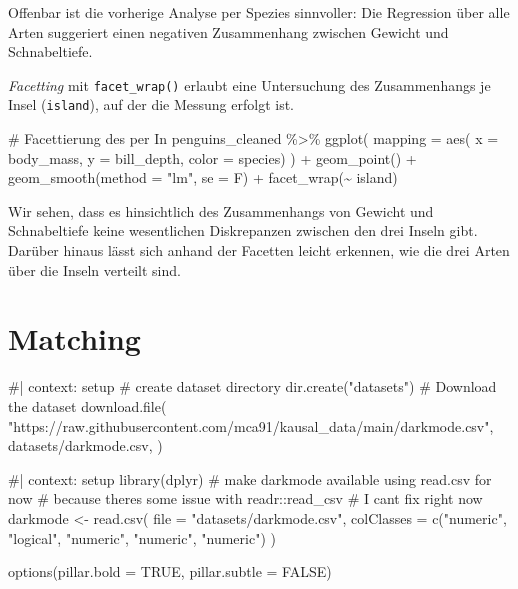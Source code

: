 \documentclass[
  a4paper,
  DIV=11,
  oneside]{scrreprt}
\newenvironment{Shaded}{\begin{snugshade}}{\end{snugshade}}
\newcommand{\NormalTok}[1]{\textcolor[rgb]{0.00,0.23,0.31}{#1}}
\begin{document}
Offenbar ist die vorherige Analyse per Spezies sinnvoller: Die
Regression über alle Arten suggeriert einen negativen Zusammenhang
zwischen Gewicht und Schnabeltiefe.

\emph{Facetting} mit \texttt{facet\_wrap()} erlaubt eine Untersuchung
des Zusammenhangs je Insel (\texttt{island}), auf der die Messung
erfolgt ist.

\begin{Shaded}
\begin{Highlighting}[]
\NormalTok{\# Facettierung des per In}
\NormalTok{penguins\_cleaned \%\textgreater{}\%}
\NormalTok{  ggplot(}
\NormalTok{    mapping = aes(}
\NormalTok{      x = body\_mass, }
\NormalTok{      y = bill\_depth, }
\NormalTok{      color = species)}
\NormalTok{  ) +}
\NormalTok{  geom\_point() +}
\NormalTok{  geom\_smooth(method = "lm", se = F) +}
\NormalTok{  facet\_wrap(\textasciitilde{} island)}
\end{Highlighting}
\end{Shaded}

Wir sehen, dass es hinsichtlich des Zusammenhangs von Gewicht und
Schnabeltiefe keine wesentlichen Diskrepanzen zwischen den drei Inseln
gibt. Darüber hinaus lässt sich anhand der Facetten leicht erkennen, wie
die drei Arten über die Inseln verteilt sind.


\chapter{Matching}\label{matching}

\begin{Shaded}
\begin{Highlighting}[]
\NormalTok{\#| context: setup}
\NormalTok{\# create dataset directory}
\NormalTok{dir.create("datasets")}
\NormalTok{\# Download the dataset}
\NormalTok{download.file(}
\NormalTok{    "https://raw.githubusercontent.com/mca91/kausal\_data/main/darkmode.csv",}
\NormalTok{    \textquotesingle{}datasets/darkmode.csv\textquotesingle{},}
\NormalTok{)}
\end{Highlighting}
\end{Shaded}

\begin{Shaded}
\begin{Highlighting}[]
\NormalTok{\#| context: setup}
\NormalTok{library(dplyr)}
\NormalTok{\# make darkmode available using read.csv for now}
\NormalTok{\# because there\textquotesingle{}s some issue with readr::read\_csv}
\NormalTok{\# I can\textquotesingle{}t fix right now}
\NormalTok{darkmode \textless{}{-} read.csv(}
\NormalTok{    file = "datasets/darkmode.csv", }
\NormalTok{    colClasses = c("numeric", "logical", "numeric", "numeric", "numeric") }
\NormalTok{)}

\NormalTok{options(pillar.bold = TRUE, pillar.subtle = FALSE)}
\end{Highlighting}
\end{Shaded}
\end{document}
